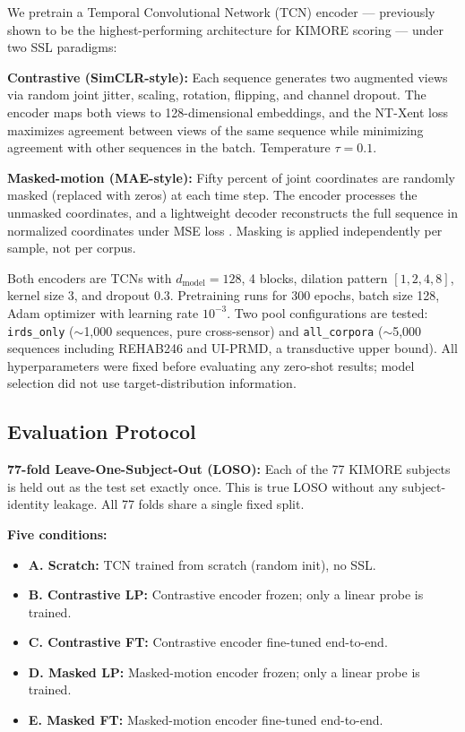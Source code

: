 \documentclass[10pt,journal]{IEEEtran}
\begin{document}
We pretrain a Temporal Convolutional Network (TCN) encoder \cite{bai2018tcn} --- previously shown to be the highest-performing architecture for KIMORE scoring --- under two SSL paradigms:

\textbf{Contrastive (SimCLR-style):} Each sequence generates two augmented views via random joint jitter, scaling, rotation, flipping, and channel dropout. The encoder maps both views to 128-dimensional embeddings, and the NT-Xent loss \cite{chen2020simclr} maximizes agreement between views of the same sequence while minimizing agreement with other sequences in the batch. Temperature $\tau = 0.1$.

\textbf{Masked-motion (MAE-style):} Fifty percent of joint coordinates are randomly masked (replaced with zeros) at each time step. The encoder processes the unmasked coordinates, and a lightweight decoder reconstructs the full sequence in normalized coordinates under MSE loss \cite{he2022mae}. Masking is applied independently per sample, not per corpus.

Both encoders are TCNs with $d_{\text{model}} = 128$, 4 blocks, dilation pattern $[1,2,4,8]$, kernel size 3, and dropout 0.3. Pretraining runs for 300 epochs, batch size 128, Adam optimizer with learning rate $10^{-3}$. Two pool configurations are tested: \texttt{irds\_only} ($\sim$1,000 sequences, pure cross-sensor) and \texttt{all\_corpora} ($\sim$5,000 sequences including REHAB246 and UI-PRMD, a transductive upper bound). All hyperparameters were fixed before evaluating any zero-shot results; model selection did not use target-distribution information.

\subsection{Evaluation Protocol}
\label{sec:eval}

\textbf{77-fold Leave-One-Subject-Out (LOSO):} Each of the 77 KIMORE subjects is held out as the test set exactly once. This is true LOSO without any subject-identity leakage. All 77 folds share a single fixed split.

\textbf{Five conditions:}
\begin{itemize}
    \item \textbf{A. Scratch:} TCN trained from scratch (random init), no SSL.
    \item \textbf{B. Contrastive LP:} Contrastive encoder frozen; only a linear probe is trained.
    \item \textbf{C. Contrastive FT:} Contrastive encoder fine-tuned end-to-end.
    \item \textbf{D. Masked LP:} Masked-motion encoder frozen; only a linear probe is trained.
    \item \textbf{E. Masked FT:} Masked-motion encoder fine-tuned end-to-end.
\end{itemize}
\end{document}
